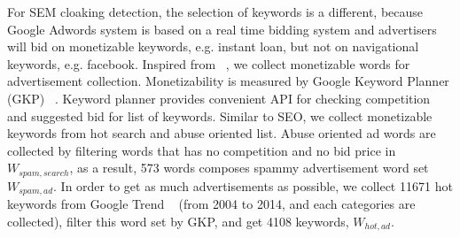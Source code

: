 For SEM cloaking detection, the selection of keywords is a different, because
Google Adwords system is based on a real time bidding system and advertisers will bid on
monetizable keywords, e.g. instant loan, but not on navigational keywords, e.g.
facebook. Inspired from ~\cite{chellapilla2006improving}, we
collect monetizable words for advertisement collection. Monetizability is
measured by Google Keyword Planner (GKP) ~\cite{keyword-planner}. Keyword planner
provides convenient API for checking competition and suggested bid for list of
keywords. Similar to SEO, we collect monetizable keywords from hot search and
abuse oriented list. Abuse oriented ad words are collected by filtering words
that has no competition and no bid price in $W_{spam, search}$, as a result, 573
words composes spammy advertisement word set $W_{spam, ad}$. In order to get as
much advertisements as possible, we collect 11671 hot keywords from Google Trend
~\cite{google-trend} (from 2004 to 2014, and each categories are collected), 
filter this word set by GKP, and get 4108 keywords, $W_{hot, ad}$.

%


%

%
%

